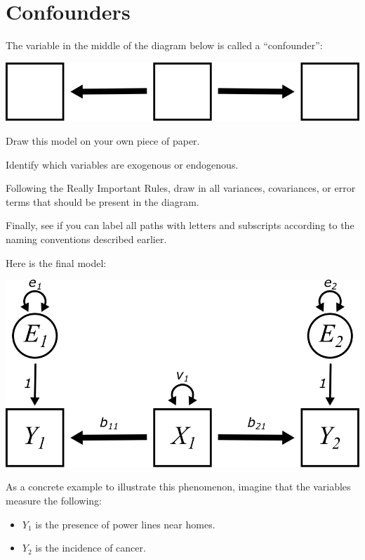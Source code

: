 \documentclass[
]{book}
\providecommand{\tightlist}{%
  \setlength{\itemsep}{0pt}\setlength{\parskip}{0pt}}
\begin{document}
\hypertarget{mediation-confounders}{%
\section{Confounders}\label{mediation-confounders}}

The variable in the middle of the diagram below is called a ``confounder'':

\begin{center}\includegraphics{graphics/confounder} \end{center}

Draw this model on your own piece of paper.

Identify which variables are exogenous or endogenous.

Following the Really Important Rules, draw in all variances, covariances, or error terms that should be present in the diagram.

Finally, see if you can label all paths with letters and subscripts according to the naming conventions described earlier.

Here is the final model:

\begin{center}\includegraphics{graphics/confounder_vars} \end{center}

As a concrete example to illustrate this phenomenon, imagine that the variables measure the following:

\begin{itemize}
\tightlist
\item
  \(Y_{1}\) is the presence of power lines near homes.
\item
  \(Y_{2}\) is the incidence of cancer.
\end{itemize}
\end{document}
